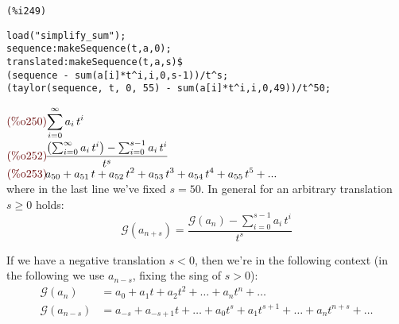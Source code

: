 \noindent
\begin{minipage}[t]{8ex}{\color{red}\bf
\begin{verbatim}
(%i249)
\end{verbatim}}
\end{minipage}
\begin{minipage}[t]{\textwidth}{\color{blue}
\begin{verbatim}
load("simplify_sum");
sequence:makeSequence(t,a,0);
translated:makeSequence(t,a,s)$
(sequence - sum(a[i]*t^i,i,0,s-1))/t^s;
(taylor(sequence, t, 0, 55) - sum(a[i]*t^i,i,0,49))/t^50;
\end{verbatim}}
\end{minipage}
\begin{math}\displaystyle
\parbox{8ex}{\color{labelcolor}(\%o250) }
\sum_{i=0}^{\infty }{a}_{i}\,{t}^{i}
\end{math}\\
\begin{math}\displaystyle
\parbox{8ex}{\color{labelcolor}(\%o252) }
\frac{\left( \sum_{i=0}^{\infty }{a}_{i}\,{t}^{i}\right) -\sum_{i=0}^{s-1}{a}_{i}\,{t}^{i}}{{t}^{s}}
\end{math}\\
\begin{math}\displaystyle
\parbox{8ex}{\color{labelcolor}(\%o253) }
{a}_{50}+{a}_{51}\,t+{a}_{52}\,{t}^{2}+{a}_{53}\,{t}^{3}+{a}_{54}\,{t}^{4}+{a}_{55}\,{t}^{5}+...
\end{math}\\
where in the last line we've fixed $s = 50$. In general for an
arbitrary translation $s \geq 0$ holds:
\begin{equation*}
\mathcal{G}(a_{n+s}) =
\frac{\mathcal{G} (a_n) -\sum_{i=0}^{s-1}{a}_{i}\,{t}^{i}}{{t}^{s}}
\end{equation*}

If we have a negative translation $s < 0$, then we're in the following
context (in the following we use $a_{n-s}$, fixing the sing of $s >
0$):
\begin{displaymath}
  \begin{split}
    \mathcal{G} (a_n) &= a_0 + a_1 t + a_2 t^2 + \ldots + a_n t^n +
    \ldots \\
    \mathcal{G} (a_{n-s}) &= a_{-s} + a_{-s+1} t + \ldots + a_0 t^s +
    a_1 t^{s+1} + \ldots + a_n t^{n+s} + \ldots
  \end{split}
\end{displaymath}

